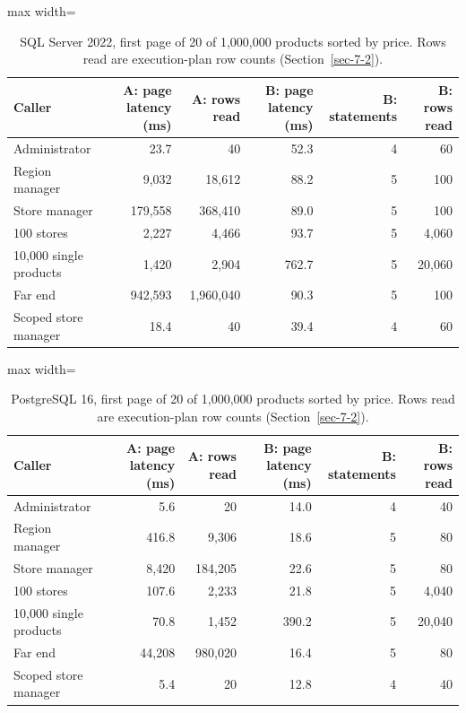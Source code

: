 \documentclass[conference]{IEEEtran}
\begin{document}
\begin{table}[!tp]
\centering
\caption{SQL Server 2022, first page of 20 of 1,000,000 products sorted by price. Rows read are execution-plan row counts (Section~\ref{sec-7-2}).}
\label{tab:4}
\scriptsize
\begin{adjustbox}{max width=\textwidth}
\begin{tabular}{@{}lrrrrr@{}}
\toprule\noalign{}
Caller & A: page latency (ms) & A: rows read & B: page latency (ms) & B: statements & B: rows read \\
\midrule\noalign{}
Administrator & 23.7 & 40 & 52.3 & 4 & 60 \\
Region manager & 9,032 & 18,612 & 88.2 & 5 & 100 \\
Store manager & 179,558 & 368,410 & 89.0 & 5 & 100 \\
100 stores & 2,227 & 4,466 & 93.7 & 5 & 4,060 \\
10,000 single products & 1,420 & 2,904 & 762.7 & 5 & 20,060 \\
Far end & 942,593 & 1,960,040 & 90.3 & 5 & 100 \\
Scoped store manager & 18.4 & 40 & 39.4 & 4 & 60 \\
\bottomrule
\end{tabular}
\end{adjustbox}
\end{table}

\begin{table}[!tp]
\centering
\caption{PostgreSQL 16, first page of 20 of 1,000,000 products sorted by price. Rows read are execution-plan row counts (Section~\ref{sec-7-2}).}
\label{tab:5}
\scriptsize
\begin{adjustbox}{max width=\textwidth}
\begin{tabular}{@{}lrrrrr@{}}
\toprule\noalign{}
Caller & A: page latency (ms) & A: rows read & B: page latency (ms) & B: statements & B: rows read \\
\midrule\noalign{}
Administrator & 5.6 & 20 & 14.0 & 4 & 40 \\
Region manager & 416.8 & 9,306 & 18.6 & 5 & 80 \\
Store manager & 8,420 & 184,205 & 22.6 & 5 & 80 \\
100 stores & 107.6 & 2,233 & 21.8 & 5 & 4,040 \\
10,000 single products & 70.8 & 1,452 & 390.2 & 5 & 20,040 \\
Far end & 44,208 & 980,020 & 16.4 & 5 & 80 \\
Scoped store manager & 5.4 & 20 & 12.8 & 4 & 40 \\
\bottomrule
\end{tabular}
\end{adjustbox}
\end{table}
\end{document}

